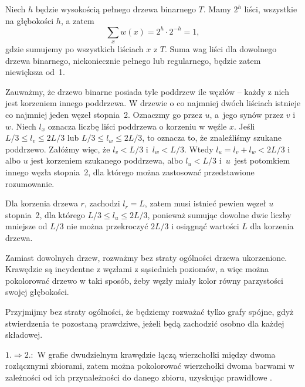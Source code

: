 Niech $h$ będzie wysokością pełnego drzewa binarnego $T$. Mamy $2^h$ liści, wszystkie na głębokości $h$, a zatem
\[
	\sum_{x}w(x) = 2^h\cdot2^{-h} = 1,
\]
gdzie sumujemy po wszystkich liściach $x$ z $T$. Suma wag liści dla dowolnego drzewa binarnego, niekoniecznie pełnego lub regularnego, będzie zatem niewiększa od~1.

\exercise %

\noindent Zauważmy, że drzewo binarne posiada tyle poddrzew ile węzłów -- każdy z nich jest korzeniem innego poddrzewa. W drzewie o co najmniej dwóch liściach istnieje co najmniej jeden węzeł stopnia~2. Oznaczmy go przez $u$, a~jego synów przez $v$ i $w$.  Niech $l_x$ oznacza liczbę liści poddrzewa o korzeniu w węźle $x$. Jeśli $L/3\le l_v\le 2L/3$ lub $L/3\le l_w\le 2L/3$, to oznacza to, że znaleźliśmy szukane poddrzewo. Załóżmy więc, że $l_v<L/3$ i~$l_w<L/3$. Wtedy $l_u=l_v+l_w<2L/3$ i albo $u$ jest korzeniem szukanego poddrzewa, albo $l_u<L/3$ i~$u$~jest potomkiem innego węzła stopnia~2, dla którego można zastosować przedstawione rozumowanie.

Dla korzenia drzewa $r$, zachodzi $l_r=L$, zatem musi istnieć pewien węzeł $u$ stopnia~2, dla którego $L/3\le l_u\le 2L/3$, ponieważ sumując dowolne dwie liczby mniejsze od $L/3$ nie można przekroczyć $2L/3$ i osiągnąć wartości $L$ dla korzenia drzewa.

\problems

\subproblem %
Zamiast dowolnych drzew, rozważmy bez straty ogólności drzewa ukorzenione. Krawędzie są incydentne z węzłami z sąsiednich poziomów, a więc można pokolorować drzewo w taki sposób, żeby węzły miały kolor równy parzystości swojej głębokości.

\subproblem %
Przyjmijmy bez straty ogólności, że będziemy rozważać tylko grafy spójne, gdyż stwierdzenia te pozostaną prawdziwe, jeżeli będą zachodzić osobno dla każdej składowej.
\bigskip

$1.\Rightarrow 2.\!\!:$ W grafie dwudzielnym krawędzie łączą wierzchołki między dwoma rozłącznymi zbiorami, zatem można pokolorować wierzchołki dwoma barwami w zależności od ich przynależności do danego zbioru, uzyskując prawidłowe .
\bigskip

